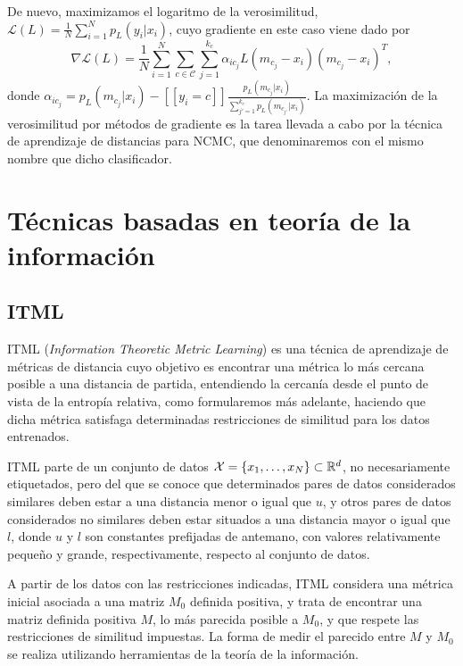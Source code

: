 De nuevo, maximizamos el logaritmo de la verosimilitud, $\mathcal{L}(L) = \frac{1}{N}\sum_{i=1}^N p_L(y_i|x_i)$, cuyo gradiente en este caso viene dado por
\begin{equation*}
    \nabla \mathcal{L}(L) = \frac{1}{N} \sum_{i=1}^N \sum_{c \in \mathcal{C}} \sum_{j=1}^{k_c} \alpha_{ic_j} L (m_{c_j}-x_i)(m_{c_j}-x_i)^T,
\end{equation*}
donde $\alpha_{ic_j} = p_L(m_{c_j}|x_i) - [\![ y_i = c ]\!] \frac{p_L(m_{c_j}|x_i)}{\sum_{j'=1}^{k_c} p_L(m_{c_{j'}}|x_i)}$. La maximización de la verosimilitud por métodos de gradiente es la tarea llevada a cabo por la técnica de aprendizaje de distancias para NCMC, que denominaremos con el mismo nombre que dicho clasificador.





\section{Técnicas basadas en teoría de la información}

\subsection{ITML}

ITML (\emph{Information Theoretic Metric Learning}) \cite{itml} es una técnica de aprendizaje de métricas de distancia cuyo objetivo es encontrar una métrica lo más cercana posible a una distancia de partida, entendiendo la cercanía desde el punto de vista de la entropía relativa, como formularemos más adelante, haciendo que dicha métrica satisfaga determinadas restricciones de similitud para los datos entrenados.

ITML parte de un conjunto de datos $\mathcal{X} = \{x_1,\dots,x_N\} \subset \mathbb{R}^d$, no necesariamente etiquetados, pero del que se conoce que determinados pares de datos considerados similares deben estar a una distancia menor o igual que $u$, y otros pares de datos considerados no similares deben estar situados a una distancia mayor o igual que $l$, donde $u$ y $l$ son constantes prefijadas de antemano, con valores relativamente pequeño y grande, respectivamente, respecto al conjunto de datos.

A partir de los datos con las restricciones indicadas, ITML considera una métrica inicial asociada a una matriz $M_0$ definida positiva, y trata de encontrar una matriz definida positiva $M$, lo más parecida posible a $M_0$, y que respete las restricciones de similitud impuestas. La forma de medir el parecido entre $M$ y $M_0$ se realiza utilizando herramientas de la teoría de la información.

